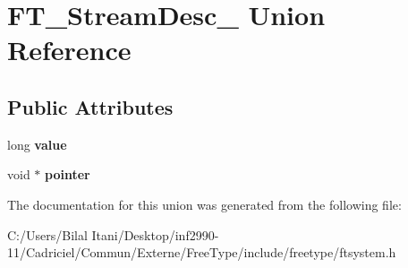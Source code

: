 \hypertarget{union_f_t___stream_desc__}{}\section{F\+T\+\_\+\+Stream\+Desc\+\_\+ Union Reference}
\label{union_f_t___stream_desc__}
\subsection*{Public Attributes}
\begin{DoxyCompactItemize}
\item 
long {\bfseries value}\hypertarget{union_f_t___stream_desc___a1a94493032faef1c3ed7bc33816ce90c}{}\label{union_f_t___stream_desc___a1a94493032faef1c3ed7bc33816ce90c}

\item 
void $\ast$ {\bfseries pointer}\hypertarget{union_f_t___stream_desc___a410ed102dc377fb9a5b9c950c3f863dc}{}\label{union_f_t___stream_desc___a410ed102dc377fb9a5b9c950c3f863dc}

\end{DoxyCompactItemize}


The documentation for this union was generated from the following file\+:\begin{DoxyCompactItemize}
\item 
C\+:/\+Users/\+Bilal Itani/\+Desktop/inf2990-\/11/\+Cadriciel/\+Commun/\+Externe/\+Free\+Type/include/freetype/ftsystem.\+h\end{DoxyCompactItemize}
